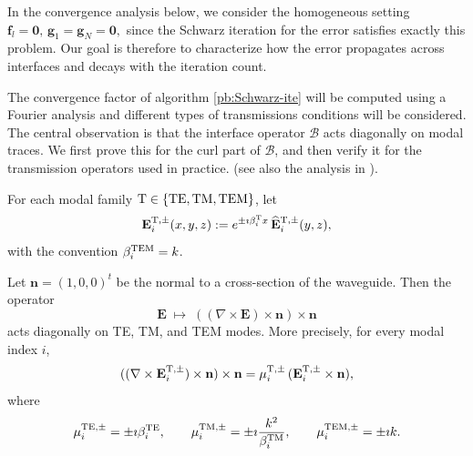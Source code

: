 \documentclass[smallextended]{svjour3}       %
\begin{document}
In the convergence analysis below, we consider the homogeneous setting
\(
\mathbf f_l=\mathbf 0,\, \mathbf g_1=\mathbf g_N=\mathbf 0,
\)
since the Schwarz iteration for the error satisfies exactly this problem. Our goal is therefore to characterize how the error propagates across interfaces and decays with the iteration count.

The convergence factor of algorithm \eqref{pb:Schwarz-ite} will be computed using a Fourier analysis and different types of transmissions conditions will be considered. 
The central observation is that the interface operator $\mathcal B$ acts diagonally on modal traces. We first prove this for the curl part of $\mathcal B$, and then verify it for the transmission operators used in practice. (see also the analysis in \cite{Dolean:2015:ETC}). 


For each modal family ${\rm T}\in\{{\rm TE,TM,TEM}\}$, let
\[
\mathbf E_i^{{\rm T},\pm}(x,y,z):=
e^{\pm \imath \beta_i^{\rm T}x}\,\widehat{\mathbf E}_i^{{\rm T},\pm}(y,z),
\]
with the convention $\beta_i^{\rm TEM}=k$.

\begin{proposition}\label{prop:BC-TE-TM}
Let $\mathbf n=(1,0,0)^t$ be the normal to a cross-section of the waveguide. Then the operator
\[
\mathbf E \;\longmapsto\; ((\nabla\times \mathbf E)\times \mathbf n)\times \mathbf n
\]
acts diagonally on TE, TM, and TEM modes. More precisely, for every modal index $i$,
\[
((\nabla\times \mathbf E_i^{{\rm T},\pm})\times \mathbf n)\times \mathbf n
=
\mu_i^{\rm T,\pm}\,(\mathbf E_i^{{\rm T},\pm}\times \mathbf n),
\]
where
\[
\mu_i^{\rm TE,\pm}=\pm \imath \beta_i^{\rm TE},
\qquad
\mu_i^{\rm TM,\pm}=\pm \imath \frac{k^2}{\beta_i^{\rm TM}},
\qquad
\mu_i^{\rm TEM,\pm}=\pm \imath k.
\]
\end{proposition}
\end{document}
